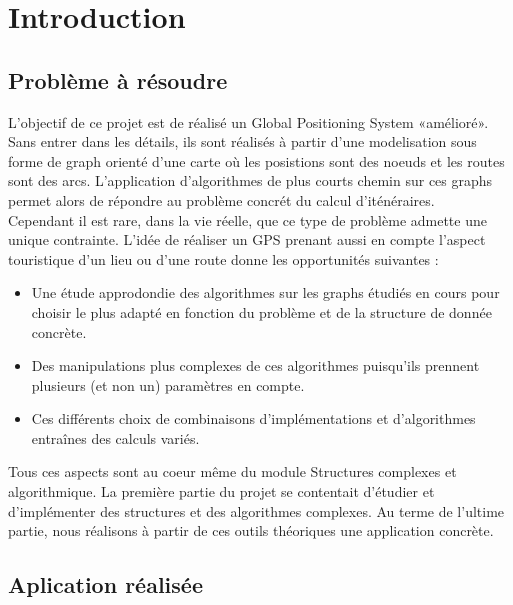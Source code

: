 \chapter{Introduction}


\section{Problème à résoudre}
L'objectif de ce projet est de réalisé un Global Positioning System «amélioré». Sans entrer dans les détails, ils sont réalisés à partir d'une modelisation sous forme de graph orienté d'une carte où les posistions sont des noeuds et les routes sont des arcs. L'application d'algorithmes de plus courts chemin sur ces graphs permet alors de répondre au problème concrét du calcul d'iténéraires.
\\
Cependant il est rare, dans la vie réelle, que ce type de problème admette une unique contrainte. L'idée de réaliser un GPS prenant aussi en compte l'aspect touristique d'un lieu ou d'une route donne les opportunités suivantes : 

\begin{itemize}
\item
Une étude approdondie des algorithmes sur les graphs étudiés en cours pour choisir le plus adapté en fonction du problème et de la structure de donnée concrète.
\item
Des manipulations plus complexes de ces algorithmes puisqu'ils prennent plusieurs (et non un) paramètres en compte.
\item
Ces différents choix de combinaisons d'implémentations et d'algorithmes entraînes des calculs variés.
\end{itemize}

Tous ces aspects sont au coeur même du module Structures complexes et algorithmique. La première partie du projet se contentait d'étudier et d'implémenter des structures et des algorithmes complexes. Au terme de l'ultime partie, nous réalisons à partir de ces outils  théoriques une application concrète.


\section{Aplication réalisée}

